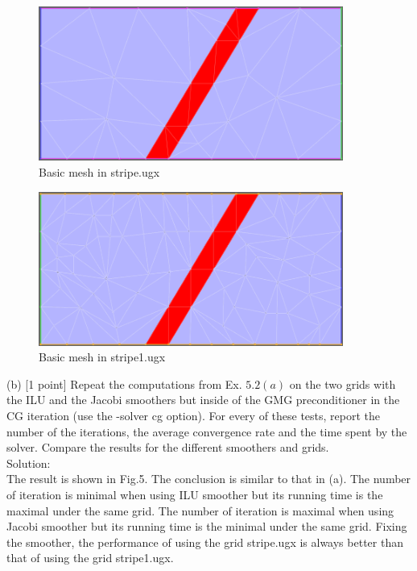\documentclass[a4paper]{article}
\begin{document}
\begin{figure}[htbp]
	\centering
	\begin{minipage}[t]{0.7\textwidth}
		\centering		\includegraphics[width=10cm]{stripe.png}
		\caption{Basic mesh in stripe.ugx}
	\end{minipage}
\end{figure}
\begin{figure}[htbp]
	\centering
	\begin{minipage}[t]{0.7\textwidth}
		\centering		\includegraphics[width=10cm]{stripe1.png}
		\caption{Basic mesh in stripe1.ugx}
	\end{minipage}
\end{figure}

\noindent (b) [1 point] Repeat the computations from Ex. $5.2(a)$ on the two grids with the ILU and the Jacobi smoothers but inside of the GMG preconditioner in the CG iteration (use the -solver cg option). For every of these tests, report the number of the iterations, the average convergence rate and the time spent by the solver. Compare the results for the different smoothers and grids.\\

\noindent Solution:\\
\noindent The result is shown in Fig.5. The conclusion is similar to that in (a). The number of iteration is minimal when using ILU smoother but its running time is the maximal under the same grid. The number of iteration is maximal when using Jacobi smoother but its running time is the minimal under the same grid. Fixing the smoother, the performance of using the grid stripe.ugx is always better  than that of using the grid stripe1.ugx.\\
\end{document}
